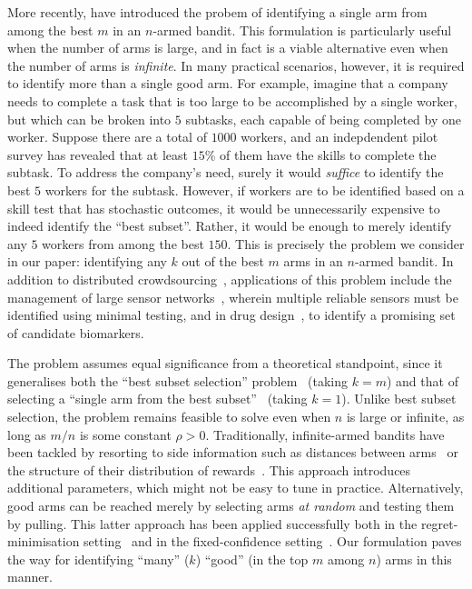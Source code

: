 More recently, \citet{bib:arcsk2017} have introduced the probem of identifying a single arm from among the best $m$ in an $n$-armed bandit. This formulation is particularly useful when the number of arms is large, and in fact is a viable alternative even when the number of arms is \textit{infinite}. In many practical scenarios, however, it is required to identify more than a single good arm. For example, imagine that a company needs to complete a task that is too large to be accomplished by a single worker, 
but which can be broken into $5$ subtasks, each capable 
of being completed by one worker. Suppose there are a total of $1000$ workers, and an indepdendent pilot survey has revealed that at least $15\%$ of them have the skills to complete the subtask. To address the company's need, surely it would \textit{suffice} to identify the best $5$ workers for the subtask. However, if workers are to be identified based on a skill test that has stochastic outcomes, it would be unnecessarily expensive to indeed identify the ``best subset''. Rather, it would be enough to merely identify any $5$ workers from among the best $150$. This is precisely the problem we consider in our paper:
identifying any $k$ out of the best $m$ arms in an $n$-armed bandit. In addition to distributed crowdsourcing~\citep{Tran-Thanh+SRJ:2014}, applications of this problem include the management of large sensor networks~\citep{Mousavi+HHD:2016}, wherein multiple 
reliable sensors must be identified using minimal testing, and in drug design~\citep[Chapter 43]{McDuffie+OJ:2016}, to identify a promising set of candidate biomarkers. 

The problem assumes equal significance from a theoretical standpoint, since it generalises both the ``best subset selection'' problem~\citep{bib:explorem} (taking $k = m$) and that of selecting a ``single arm from the best subset''~\citep{bib:arcsk2017} (taking $k = 1$). Unlike best subset selection, the problem remains feasible to solve even when $n$ is large or infinite, as long as $m/n$ is some constant $\rho > 0$. Traditionally, infinite-armed bandits have been tackled by resorting to side information such as distances between arms~\citep{bib:agracntregret,bib:kleincntregret} or the structure of their distribution of rewards~\citep{bib:wang2008}. This approach introduces additional parameters, which might not be easy to tune in practice. Alternatively, good arms can be reached merely by selecting arms \textit{at random} and testing them by pulling. This latter approach has been applied successfully both in the regret-minimisation setting~\citep{Herschkorn+PR:1996} and in the fixed-confidence setting~\citep{bib:sergiu,bib:arcsk2017}. Our formulation paves the way for identifying ``many'' ($k$) ``good'' (in the top $m$ among $n$) arms in this manner. 

